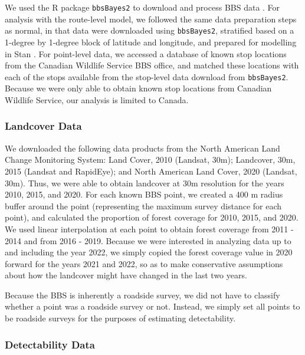 \documentclass[12pt]{article}
\begin{document}
\par We used the R package \texttt{bbsBayes2} to download and process BBS data \citep{edwards_bbsbayes_2021}. 
For analysis with the route-level model, we followed the same data preparation steps as normal, in that data were downloaded using \texttt{bbsBayes2}, stratified based on a 1-degree by 1-degree block of latitude and longitude, and prepared for modelling in Stan \citep{stan_development_team_stan_2024}.
For point-level data, we accessed a database of known stop locations from the Canadian Wildlife Service BBS office, and matched these locations with each of the stops available from the stop-level data download from \texttt{bbsBayes2}.
Because we were only able to obtain known stop locations from Canadian Wildlife Service, our analysis is limited to Canada.

\subsubsection{Landcover Data}

\par We downloaded the following data products from the North American Land Change Monitoring System: Land Cover, 2010 (Landsat, 30m); Landcover, 30m, 2015 (Landsat and RapidEye); and North American Land Cover, 2020 (Landsat, 30m).
Thus, we were able to obtain landcover at 30m resolution for the years 2010, 2015, and 2020. 
For each known BBS point, we created a 400 m radius buffer around the point (representing the maximum survey distance for each point), and calculated the proportion of forest coverage for 2010, 2015, and 2020. 
We used linear interpolation at each point to obtain forest coverage from 2011 - 2014 and from 2016 - 2019. 
Because we were interested in analyzing data up to and including the year 2022, we simply copied the forest coverage value in 2020 forward for the years 2021 and 2022, so as to make conservative assumptions about how the landcover might have changed in the last two years.

\par Because the BBS is inherently a roadside survey, we did not have to classify whether a point was a roadside survey or not.
Instead, we simply set all points to be roadside surveys for the purposes of estimating detectability.

\subsubsection{Detectability Data}
\end{document}
